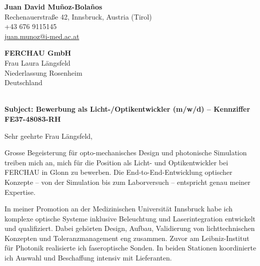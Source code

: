 \documentclass[11pt,a4paper]{article}
\begin{document}
\textbf{\large Juan David Muñoz-Bolaños} \\
Rechenauerstraße 42, Innsbruck, Austria (Tirol) \\
+43 676 9115145 \\
\href{mailto:juan.munoz@i-med.ac.at}{juan.munoz@i-med.ac.at}

\vspace{8pt}

\textbf{FERCHAU GmbH} \\
Frau Laura Längsfeld \\
Niederlassung Rosenheim \\
Deutschland \\
 \\


\vspace{8pt}

\textbf{Subject: Bewerbung als Licht-/Optikentwickler (m/w/d) – Kennziffer FE37-48083-RH}

\vspace{4pt}

Sehr geehrte Frau Längsfeld,


Grosse Begeisterung für opto-mechanisches Design und photonische Simulation treiben mich an, mich für die Position als Licht- und Optikentwickler bei FERCHAU in Glonn zu bewerben. Die End-to-End-Entwicklung optischer Konzepte – von der Simulation bis zum Laborversuch – entspricht genau meiner Expertise.



In meiner Promotion an der Medizinischen Universität Innsbruck habe ich komplexe optische Systeme inklusive Beleuchtung und Laserintegration entwickelt und qualifiziert. Dabei gehörten Design, Aufbau, Validierung von lichttechnischen Konzepten und Toleranzmanagement eng zusammen. Zuvor am Leibniz-Institut für Photonik realisierte ich faseroptische Sonden. In beiden Stationen koordinierte ich Auswahl und Beschaffung intensiv mit Lieferanten.
\end{document}
